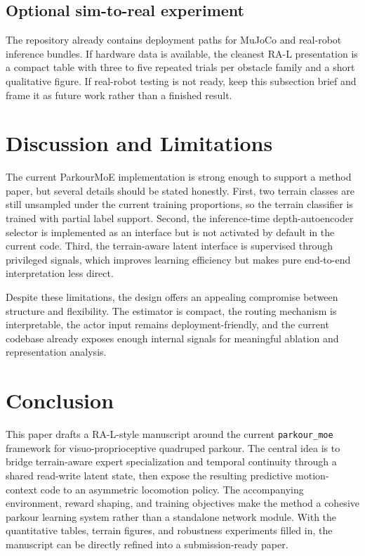\documentclass[letterpaper,10pt,conference]{ieeeconf}
\begin{document}
\subsection{Optional sim-to-real experiment}
The repository already contains deployment paths for MuJoCo and real-robot inference bundles. If hardware data is available, the cleanest RA-L presentation is a compact table with three to five repeated trials per obstacle family and a short qualitative figure. If real-robot testing is not ready, keep this subsection brief and frame it as future work rather than a finished result.

\section{Discussion and Limitations}
The current ParkourMoE implementation is strong enough to support a method paper, but several details should be stated honestly. First, two terrain classes are still unsampled under the current training proportions, so the terrain classifier is trained with partial label support. Second, the inference-time depth-autoencoder selector is implemented as an interface but is not activated by default in the current code. Third, the terrain-aware latent interface is supervised through privileged signals, which improves learning efficiency but makes pure end-to-end interpretation less direct.

Despite these limitations, the design offers an appealing compromise between structure and flexibility. The estimator is compact, the routing mechanism is interpretable, the actor input remains deployment-friendly, and the current codebase already exposes enough internal signals for meaningful ablation and representation analysis.

\section{Conclusion}
This paper drafts a RA-L-style manuscript around the current \texttt{parkour\_moe} framework for visuo-proprioceptive quadruped parkour. The central idea is to bridge terrain-aware expert specialization and temporal continuity through a shared read-write latent state, then expose the resulting predictive motion-context code to an asymmetric locomotion policy. The accompanying environment, reward shaping, and training objectives make the method a cohesive parkour learning system rather than a standalone network module. With the quantitative tables, terrain figures, and robustness experiments filled in, the manuscript can be directly refined into a submission-ready paper.

\balance


\end{document}
